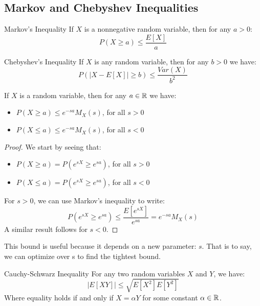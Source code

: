 \subsection{Markov and Chebyshev Inequalities}
\begin{thm}{Markov's Inequality}{}
If \(X\) is a nonnegative random variable, then for any \(a > 0\):
\begin{equation*}
  P(X \geq a) \leq \frac{E[X]}{a}
\end{equation*}


\end{thm}

\begin{thm}{Chebyshev's Inequality}{}
If \(X\) is any random variable, then for any \(b > 0\) we have: 
\begin{equation*}
  P(|X - E[X]| \geq b) \leq \frac{Var(X)}{b^2}
\end{equation*}

\end{thm}

\begin{thm}{}{}
If \(X\) is a random variable, then for any \(a \in {\mathbb R}\) we have:
\begin{itemize}
  \item \(P(X \geq a) \leq e^{-sa}M_X(s)\), for all \(s > 0\)
  \item \(P(X \leq a) \leq e^{-sa}M_X(s)\), for all \(s < 0\)
\end{itemize}
\begin{proof}
We start by seeing that:
\begin{itemize}
  \item \(P(X \geq a) = P(e^{sX} \geq e^{sa})\), for all \(s > 0\)
  \item \(P(X \leq a) = P(e^{sX} \geq e^{sa})\), for all \(s < 0\)
\end{itemize}
For \(s > 0\), we can use Markov's inequality to write:
\begin{equation*}
  P(e^{sX} \geq e^{sa}) \leq \frac{E[e^{sX}]}{e^{sa}} = e^{-sa}M_X(s)
\end{equation*}
A similar result follows for \(s < 0\).

\end{proof}
This bound is useful because it depends on a new parameter: \(s\). That is to say, we can optimize over s to find the tightest bound.


\end{thm}

\begin{thm}{Cauchy-Schwarz Inequality}{}
For any two random variables \(X\) and \(Y\), we have:
\begin{equation*}
  |E[XY]| \leq \sqrt{E[X^2]E[Y^2]}
\end{equation*}
Where equality holds if and only if \(X = \alpha Y\) for some constant \(\alpha \in {\mathbb R}\).

\end{thm}







